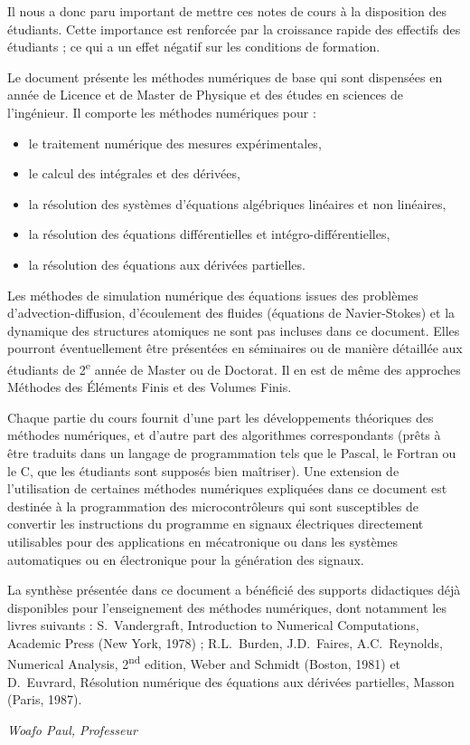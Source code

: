 Il nous a donc paru important de mettre ces notes de cours à la disposition
des étudiants. Cette importance est renforcée par la croissance rapide des
effectifs des étudiants ; ce qui a un effet négatif sur les conditions de
formation.

Le document présente les méthodes numériques de base qui sont dispensées en
année de Licence et de Master de Physique et des études en sciences de
l'ingénieur. Il comporte les méthodes numériques pour :
\begin{itemize}[label=--]
  \item le traitement numérique des mesures expérimentales,
  \item le calcul des intégrales et des dérivées,
  \item la résolution des systèmes d'équations algébriques linéaires et non
        linéaires,
  \item la résolution des équations différentielles et
        intégro-différentielles,
  \item la résolution des équations aux dérivées partielles.
\end{itemize}

Les méthodes de simulation numérique des équations issues des problèmes
d'advection-diffusion, d'écoulement des fluides (équations de Navier-Stokes)
et la dynamique des structures atomiques ne sont pas incluses dans ce
document. Elles pourront éventuellement être présentées en séminaires ou de
manière détaillée aux étudiants de 2\textsuperscript{e} année de Master ou de
Doctorat. Il en est de même des approches Méthodes des Éléments Finis et des
Volumes Finis.

Chaque partie du cours fournit d'une part les développements théoriques des
méthodes numériques, et d'autre part des algorithmes correspondants (prêts à
être traduits dans un langage de programmation tels que le Pascal, le Fortran
ou le C, que les étudiants sont supposés bien maîtriser). Une extension de
l'utilisation de certaines méthodes numériques expliquées dans ce document est
destinée à la programmation des microcontrôleurs qui sont susceptibles de
convertir les instructions du programme en signaux électriques directement
utilisables pour des applications en mécatronique ou dans les systèmes
automatiques ou en électronique pour la génération des signaux.

La synthèse présentée dans ce document a bénéficié des supports didactiques
déjà disponibles pour l'enseignement des méthodes numériques, dont notamment
les livres suivants : S.~Vandergraft, \og Introduction to Numerical
Computations\fg{}, Academic Press (New York, 1978) ; R.L.~Burden,
J.D.~Faires, A.C.~Reynolds, \og Numerical Analysis\fg{}, 2\textsuperscript{nd}
edition, Weber and Schmidt (Boston, 1981) et D.~Euvrard, \og Résolution
numérique des équations aux dérivées partielles\fg{}, Masson (Paris, 1987).

\begin{flushright}
  \textit{Woafo Paul, Professeur}
\end{flushright}
